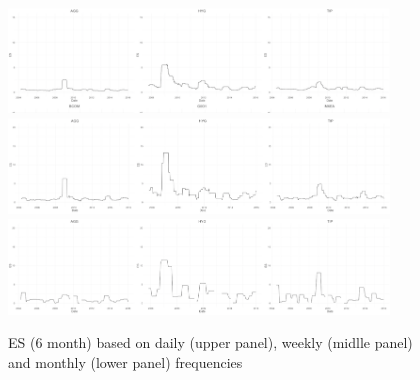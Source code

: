 \documentclass[12pt]{article}
\begin{document}
\begin{figure}[h]
\caption{ES (6 month) based on daily (upper panel), weekly (midlle panel) and monthly (lower panel) frequencies} 
\centering 
\includegraphics[width=0.9\textwidth]{../figures/rolling_stats/daily_ES}
\includegraphics[width=0.9\textwidth]{../figures/rolling_stats/weekly_ES}
\includegraphics[width=0.9\textwidth]{../figures/rolling_stats/monthly_ES}
\label{fig: ES_daily_weekly_monthly}
\end{figure}



\end{document}
